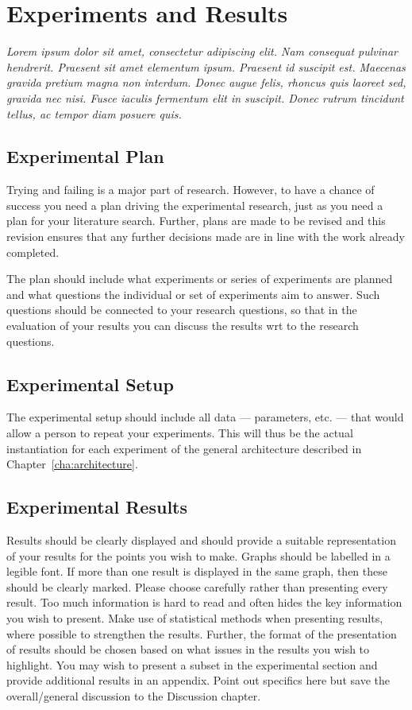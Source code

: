 \chapter{Experiments and Results}
\label{cha:experiments}

\textit{Lorem ipsum dolor sit amet, consectetur adipiscing elit. Nam consequat pulvinar hendrerit. Praesent sit amet elementum ipsum. Praesent id suscipit est. Maecenas gravida pretium magna non interdum. Donec augue felis, rhoncus quis laoreet sed, gravida nec nisi. Fusce iaculis fermentum elit in suscipit. Donec rutrum tincidunt tellus, ac tempor diam posuere quis. }

\section{Experimental Plan}
\label{sec:experimentalPlan}

Trying and failing is a major part of research. However, to have a chance of success you need a plan driving the experimental research, just as you need a plan for your literature search. Further, plans are made to be revised and this revision ensures that any further decisions made are in line with the work already completed.  

The plan should include what experiments or series of experiments are planned and what questions the individual or set of experiments aim to answer. Such questions should be connected to your research questions, so that in the evaluation of your results you can discuss the results wrt to the research questions.  

\section{Experimental Setup}
\label{sec:experimentalSetup}

The experimental setup should include all data --- parameters, etc. --- that would allow a person to repeat your experiments. 
This will thus be the actual instantiation for each experiment of the general architecture described in Chapter~\ref{cha:architecture}.

\section{Experimental Results}
\label{sec:experimentalResults}

Results should be clearly displayed and should provide a suitable representation of your results for the points you wish to make. 
Graphs should be labelled in a legible font. If more than one result is displayed in the same graph, then these should be clearly marked. 
Please choose carefully rather than presenting every result. Too much information is hard to read and often hides the key information you wish to present. Make use of statistical methods when presenting results, where possible to strengthen the results.  
Further, the format of the presentation of results should be chosen based on what issues in the results you wish to highlight. 
You may wish to present a subset in the experimental section and provide additional results in an appendix.
Point out specifics here but save the overall/general discussion to the Discussion chapter. 

\glsresetall
